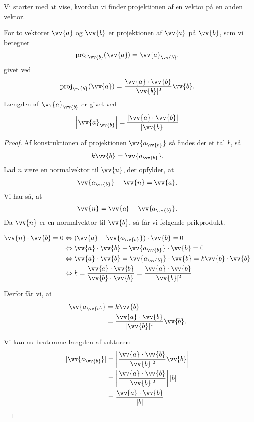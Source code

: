 Vi starter med at vise, hvordan vi finder projektionen af en vektor på en anden vektor. 
\begin{setn}[Projektionssætningen]
For to vektorer $\vv{a}$ og $\vv{b}$ er projektionen af $\vv{a}$ på $\vv{b}$, som vi betegner
\begin{align*}
\textnormal{proj}_{\vv{b}}(\vv{a}) = \vv{a}_{\vv{b}}, 
\end{align*}
givet ved
\begin{align*}
\textnormal{proj}_{\vv{b}}(\vv{a}) = \frac{\vv{a}\cdot \vv{b}}{|\vv{b}|^2} \vv{b}.
\end{align*}
Længden af  $\vv{a}_{\vv{b}}$ er givet ved
\begin{align*}
\left|\vv{a}_{\vv{b}}\right| = \frac{|\vv{a}\cdot \vv{b}|}{|\vv{b}|}
\end{align*}
\end{setn}
\begin{proof}
Af konstruktionen af projektionen $\vv{a_{\vv{b}}}$ så findes der et tal $k$, så 
\begin{align*}
k\vv{b} = \vv{a_{\vv{b}}}.
\end{align*}
Lad $n$ være en normalvektor til $\vv{u}$, der opfylder, at 
\begin{align*}
\vv{a_{\vv{b}}} + \vv{n} = \vv{a}.
\end{align*}
Vi har så, at 
\begin{align*}
\vv{n} = \vv{a} - \vv{a_{\vv{b}}}.
\end{align*}
Da $\vv{n}$ er en normalvektor til $\vv{b}$, så får vi følgende prikprodukt.

\begin{align*}
\vv{n} \cdot \vv{b}=0 &\Leftrightarrow (\vv{a}-\vv{a_{\vv{b}}}) \cdot \vv{b} = 0 \\
&\Leftrightarrow \vv{a}\cdot \vv{b} - \vv{a_{\vv{b}}}\cdot \vv{b} = 0 \\
&\Leftrightarrow \vv{a}\cdot \vv{b} = \vv{a_{\vv{b}}}\cdot \vv{b} = k \vv{b} \cdot \vv{b} \\
&\Leftrightarrow k  = \frac{\vv{a}\cdot \vv{b}}{\vv{b} \cdot \vv{b}} = \frac{\vv{a}\cdot \vv{b}}{|\vv{b}|^2}
\end{align*}

Derfor får vi, at 
\begin{align*}
\vv{a_{\vv{b}}} &= k \vv{b}\\
&= \frac{\vv{a}\cdot \vv{b}}{|\vv{b}|^2} \vv{b}.
\end{align*} 

Vi kan nu bestemme længden af vektoren:
\begin{align*}
|\vv{a_{\vv{b}}}| &= \left|\frac{\vv{a}\cdot \vv{b}}{|\vv{b}|^2}\vv{b}\right|\\
&= \left|\frac{\vv{a}\cdot \vv{b}}{|\vv{b}|^2}\right||b| \\
&= \frac{\vv{a} \cdot \vv{b}}{|b|}
\end{align*}
\end{proof}

